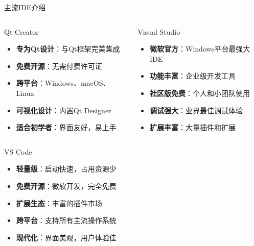 \documentclass[UTF8,aspectratio=169]{beamer}
\begin{document}
\begin{frame}{主流IDE介绍}
    \begin{columns}
        \begin{column}{0.48\textwidth}
            \begin{ytublock}{Qt Creator}
                \begin{itemize}
                    \item \textbf{专为Qt设计}：与Qt框架完美集成
                    \item \textbf{免费开源}：无需付费许可证
                    \item \textbf{跨平台}：Windows、macOS、Linux
                    \item \textbf{可视化设计}：内置Qt Designer
                    \item \textbf{适合初学者}：界面友好，易上手
                \end{itemize}
            \end{ytublock}
        \end{column}
        \hspace{0.02\textwidth}
        \begin{column}{0.48\textwidth}
            \begin{ytublock}{Visual Studio}
                \begin{itemize}
                    \item \textbf{微软官方}：Windows平台最强大IDE
                    \item \textbf{功能丰富}：企业级开发工具
                    \item \textbf{社区版免费}：个人和小团队使用
                    \item \textbf{调试强大}：业界最佳调试体验
                    \item \textbf{扩展丰富}：大量插件和扩展
                \end{itemize}
            \end{ytublock}
        \end{column}
    \end{columns}

    \begin{ytublock}{VS Code}
        \begin{itemize}
            \item \textbf{轻量级}：启动快速，占用资源少
            \item \textbf{免费开源}：微软开发，完全免费
            \item \textbf{扩展生态}：丰富的插件市场
            \item \textbf{跨平台}：支持所有主流操作系统
            \item \textbf{现代化}：界面美观，用户体验佳
        \end{itemize}
    \end{ytublock}
\end{frame}
\end{document}
